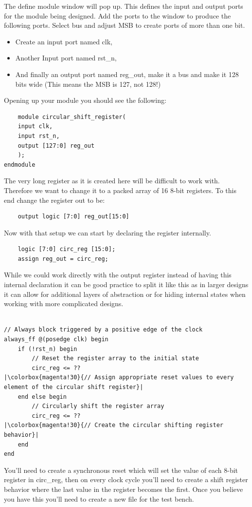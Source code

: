 The define module window will pop up. This defines the input and output ports for the module being designed. Add the ports to the window to produce the following ports. Select bus and adjust MSB to create ports of more than one bit.
\begin{itemize}
    \item Create an input port named clk,
    \item Another Input port named rst\_n,
    \item And finally an output port named reg\_out, make it a bus and make it 128 bits wide (This means the MSB is 127, not 128!)
\end{itemize}
Opening up your module you should see the following:
\begin{verbatim}
    module circular_shift_register(
    input clk,
    input rst_n,
    output [127:0] reg_out
    );
endmodule
\end{verbatim}
The very long register as it is created here will be difficult to work with. Therefore we want to change it to a packed array of 16 8-bit registers. To this end change the register out to be:
\begin{verbatim}
    output logic [7:0] reg_out[15:0]
\end{verbatim}
Now with that setup we can start by declaring the register internally.
\begin{verbatim}
    logic [7:0] circ_reg [15:0];
    assign reg_out = circ_reg;
\end{verbatim}
While we could work directly with the output register instead of having this internal declaration it can be good practice to split it like this as in larger designs it can allow for additional layers of abstraction or for hiding internal states when working with more complicated designs.

\begin{lstlisting}

// Always block triggered by a positive edge of the clock
always_ff @(posedge clk) begin
    if (!rst_n) begin
        // Reset the register array to the initial state
        circ_reg <= ??
|\colorbox{magenta!30}{// Assign appropriate reset values to every element of the circular shift register}|
    end else begin
        // Circularly shift the register array
        circ_reg <= ??
|\colorbox{magenta!30}{// Create the circular shifting register behavior}|
    end
end
\end{lstlisting}

You'll need to create a synchronous reset which will set the value of each 8-bit register in circ\_reg, then on every clock cycle you'll need to create a shift register behavior where the last value in the register becomes the first. Once you believe you have this you'll need to create a new file for the test bench.\\

